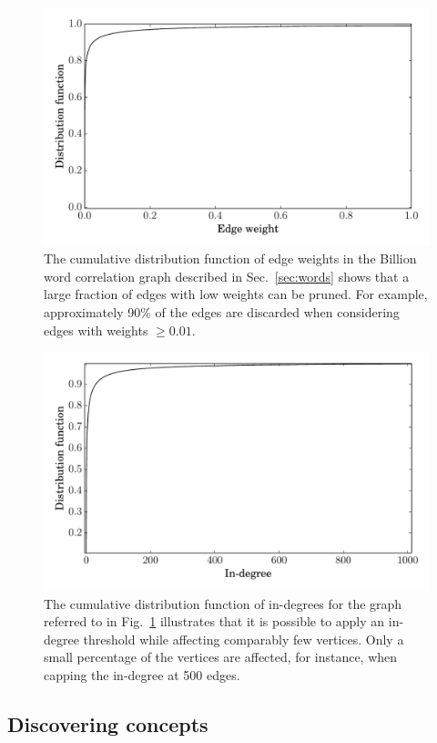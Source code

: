 \documentclass{kais}
\begin{document}
\begin{figure}
\centerline{\includegraphics[width=0.75\columnwidth]{figures/billion-ew-cdf.pdf}}
\caption{The cumulative distribution function of edge weights in the Billion word correlation graph described in 
Sec.\ \ref{sec:words} shows that a large fraction of edges with low weights can be pruned. For example, 
approximately 90\% of the edges are discarded when considering edges with weights $\geq 0.01$.}
\label{fig:billion-ew-cdf}
\end{figure}

\begin{figure}
\centerline{\includegraphics[width=0.75\columnwidth]{figures/billion-id-cdf.pdf}}
\caption{The cumulative distribution function of in-degrees for the graph referred to in Fig.\ \ref{fig:billion-ew-cdf}
 illustrates that it is possible to apply an in-degree threshold while affecting comparably few vertices. Only a small percentage
  of the vertices are affected, for instance, when capping the in-degree at 500 edges.}
\label{fig:billion-id-cdf}
\end{figure}

\subsection{Discovering concepts}
\label{sec:discoveringConcepts}
\end{document}
